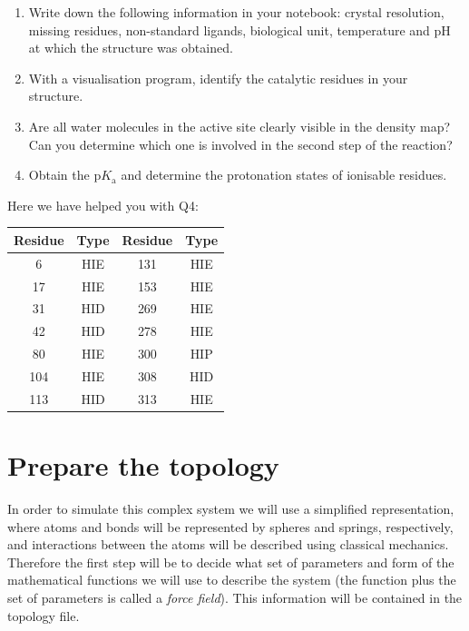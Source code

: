 \documentclass[10pt]{article}
\begin{document}
\begin{question}
    \begin{enumerate}[leftmargin=0.6cm]
        \renewcommand{\labelenumi}{Q\arabic{enumi}.}
        \item Write down the following information in your notebook: crystal resolution, missing residues, non-standard ligands, biological unit, temperature and pH at which the structure was obtained.
        \item With a visualisation program, identify the catalytic residues in your structure.
        \item Are all water molecules in the active site clearly visible in the density map? Can you determine which one is involved in the second step of the reaction?
        \item Obtain the \(\mathrm pK_\mathrm{a}\) and determine the protonation states of ionisable residues. 
    \end{enumerate}
\end{question}

Here we have helped you with Q4:

\begin{center}
    \begin{tabular}{cc|cc}
        \toprule
        Residue & Type & Residue & Type \\
        \midrule
        6       & HIE  & 131     & HIE  \\
        17      & HIE  & 153     & HIE  \\
        31      & HID  & 269     & HIE  \\
        42      & HID  & 278     & HIE  \\
        80      & HIE  & 300     & HIP  \\
        104     & HIE  & 308     & HID  \\
        113     & HID  & 313     & HIE  \\
        \bottomrule
    \end{tabular}
\end{center}


\section{Prepare the topology}

In order to simulate this complex system we will use a simplified representation, where atoms and bonds will be represented by spheres and springs, respectively, and interactions between the atoms will be described using classical mechanics. Therefore the first step will be to decide what set of parameters and form of the mathematical functions we will use to describe the system (the function plus the set of parameters is called a \textit{force field}). This information will be contained in the topology file. 
\end{document}
